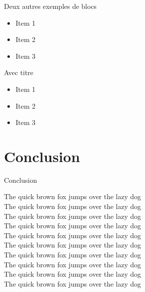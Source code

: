 \documentclass[A4,svgnames,9pt,aspectratio=169]{beamer}
\begin{document}
\begin{frame}{Deux autres exemples de blocs}
    \begin{exampleblock}{}
      \begin{itemize}
        \item{Item 1 }
        \item {Item 2}
        \item {Item 3}
      \end{itemize}
    \end{exampleblock}
    \begin{exampleblock}{Avec titre}
      \begin{itemize}
        \item{Item 1 }
        \item {Item 2}
        \item {Item 3}
      \end{itemize}
    \end{exampleblock}
\end{frame}


\section{Conclusion}
\begin{frame}{Conclusion}

    {\tiny         The quick brown fox jumps over the lazy dog}\\
    {\scriptsize   The quick brown fox jumps over the lazy dog}\\
    {\footnotesize The quick brown fox jumps over the lazy dog}\\
    {\small        The quick brown fox jumps over the lazy dog}\\
    {\normalsize   The quick brown fox jumps over the lazy dog}\\
    {\large        The quick brown fox jumps over the lazy dog}\\
    {\Large        The quick brown fox jumps over the lazy dog}\\
    {\LARGE        The quick brown fox jumps over the lazy dog}\\
    {\huge         The quick brown fox jumps over the lazy dog}\\
    {\Huge         The quick brown fox jumps over the lazy dog}

\end{frame}


\frame{\merci}

\end{document}
